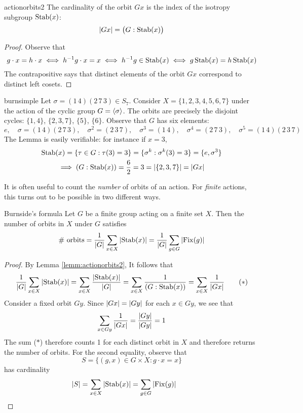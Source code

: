 \begin{lemm}{}{actionorbits2}
	The cardinality of the orbit $Gx$ is the index of the isotropy subgroup $\operatorname{Stab}(x)$:
	\[
		\left| Gx\right|=\bigl(G:\operatorname{Stab}(x)\bigr)
	\]
\end{lemm}


\begin{proof}
	Observe that
	\[
		g\cdot x=h\cdot x
		\iff h^{-1}g\cdot x=x
		\iff h^{-1}g\in \operatorname{Stab}(x)
		\iff g\operatorname{Stab}(x)=h\operatorname{Stab}(x)
	\]
	The contrapositive says that distinct elements of the orbit $Gx$ correspond to distinct left cosets.
\end{proof}


\begin{example}{}{burnsimple}
	Let $\sigma=(1\,4)(2\,7\,3)\in S_7$. Consider $X=\{1,2,3,4,5,6,7\}$ under the action of the cyclic group $G=\left\langle \sigma\right\rangle$. The orbits are precisely the disjoint cycles: $\{1,4\}$, $\{2,3,7\}$, $\{5\}$, $\{6\}$. Observe that $G$ has six elements:
	\[
		e,\quad 
		\sigma=(1\,4)(2\,7\,3),\quad 
		\sigma^2=(2\,3\,7),\quad 
		\sigma^3=(1\,4),\quad 
		\sigma^4=(2\,7\,3),\quad 
		\sigma^5=(1\,4)(2\,3\,7)
		\]
	The Lemma is easily verifiable: for instance if $x=3$,
	\begin{gather*}
		\operatorname{Stab}(x)=\{\tau\in G:\tau(3)=3\}=\{\sigma^k:\sigma^k(3)=3\}=\{e,\sigma^3\}\\
		\implies (G:\operatorname{Stab}(x))=\frac 62=3=\left| \{2,3,7\}\right|=\left| Gx\right|
	\end{gather*}
\end{example}



It is often useful to count the \emph{number} of orbits of an action. For \emph{finite} actions, this turns out to be possible in two different ways.

\begin{thm}{Burnside's formula}{}
	Let $G$ be a finite group acting on a finite set $X$. Then the number of orbits in $X$ under $G$ satisfies
	\[
		\text{\# orbits}
		=\frac{1}{\left| G\right|}\sum_{x\in X}\left| \operatorname{Stab}(x)\right|
		=\frac{1}{\left| G\right|}\sum_{g\in G}\left| \operatorname{Fix}(g)\right|
	\]
\end{thm}

\begin{proof}
	By Lemma \ref{lemm:actionorbits2},
	It follows that
	\[
		\frac 1{\left| G\right|}\sum_{x\in X}\left| \operatorname{Stab}(x)\right| 
		=\sum_{x\in X}\frac{\left| \operatorname{Stab}(x)\right|}{\left| G\right|} 
		=\sum_{x\in X}\frac 1{(G:\operatorname{Stab}(x))} 
		=\sum_{x\in X}\frac{1}{\left| Gx\right|}
		\tag*{($\ast$)}
	\]
	Consider a fixed orbit $Gy$. Since $\left| Gx\right|=\left| Gy\right|$ for each $x\in Gy$, we see that
	\[
		\sum_{x\in Gy}\frac{1}{\left| Gx\right|}
		=\frac{\left| Gy\right|}{\left| Gy\right|}=1
	\]
	The sum ($\ast$) therefore counts 1 for each distinct orbit in $X$ and therefore returns the number of orbits.\smallbreak
	For the second equality, observe that
	\[
		S=\{(g,x)\in G\times X:g\cdot x=x\}
	\]
	has cardinality
	\[
		\left| S\right|=\sum\limits_{x\in X}\left| \operatorname{Stab}(x)\right|
		=\sum\limits_{g\in G}\left| \operatorname{Fix}(g)\right|
		\tag*{\qedhere}
	\]
\end{proof}



